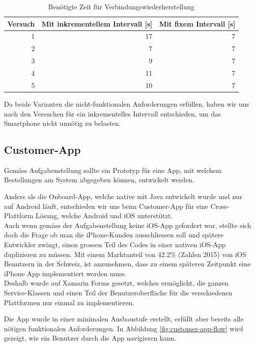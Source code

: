 \begin{table}
	
	\centering
	\begin{tabular}{|r|r|r|}
		\hline
		\textbf{Versuch} & \textbf{Mit inkrementellem Intervall [s] } & \textbf{Mit fixem Intervall [s]} \\
		\hline
		1 & 17 & 7 \\
		2 &	7 & 7 \\
		3 & 9 & 7 \\
 		4 & 11 & 7 \\
		5 & 10 & 7 \\
		\hline
	\end{tabular}
	\caption{Benötigte Zeit für Verbindungswiederherstellung}
	\label{tbl:backoff}
\end{table}

Da beide Varianten die nicht-funktionalen Anforderungen erfüllen, haben wir uns nach den Versuchen für ein inkrementelles Intervall entschieden, um das Smartphone nicht unnötig zu belasten.

\subsection{Customer-App}
Gemäss Aufgabenstellung sollte ein Prototyp für eine App, mit welchem Bestellungen am System abgegeben können, entwickelt werden.

Anders als die Onboard-App, welche native mit Java entwickelt wurde und nur auf Android läuft, entschieden wir uns beim Customer-App für eine Cross-Plattform Lösung, welche Android und iOS unterstützt. \\

Auch wenn gemäss der Aufgabenstellung keine iOS-App gefordert war, stellte sich doch die Frage ob man die iPhone-Kunden ausschliessen soll und spätere Entwickler zwingt, einen grossen Teil des Codes in einer nativen iOS-App duplizieren zu müssen. Mit einem Marktanteil von 42.2\% (Zahlen 2015) \cite{ios-user} von iOS Benutzern in der Schweiz, ist anzunehmen, dass zu einem späteren Zeitpunkt eine iPhone App implementiert werden muss.\\

Deshalb wurde auf Xamarin Forms gesetzt, welches ermöglicht, die ganzen Service-Klassen und einen Teil der Benutzeroberfläche für die verschiedenen Plattformen nur einmal zu implementieren.

Die App wurde in einer minimalen Ausbaustufe erstellt, erfüllt aber bereits alle nötigen funktionalen Anforderungen. In Abbildung \ref{fig:customer-app-flow} wird gezeigt, wie ein Benutzer durch die App navigieren kann. 


